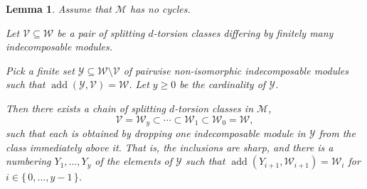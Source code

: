 \documentclass[12pt,reqno]{amsart}
\def\cM{\mathscr{M}}
\def\cV{\mathscr{V}}
\def\cW{\mathscr{W}}
\def\cY{\mathscr{Y}}
\def\add{\operatorname{add}}
\numberwithin{equation}{section}
\newtheorem{Lemma}{Lemma}[section]
\theoremstyle{definition}
\theoremstyle{theorem}
\theoremstyle{definition}
\begin{document}
\begin{Lemma}
\label{lem:deleting_an_indecomposable_from_a_d-torsion_class}
Assume that $\cM$ has no cycles.  

Let $\cV \subseteq \cW$ be a pair of splitting $d$-torsion classes differing by finitely many indecomposable modules.  

Pick a finite set $\cY \subseteq \cW \setminus \cV$ of pairwise non-isomorphic indecomposable modules such that $\add( \cY,\cV ) = \cW$.  Let $y \geqslant 0$ be the cardinality of $\cY\!$.

Then there exists a chain of splitting $d$-torsion classes in $\cM\!$,
\begin{equation}
\label{equ:lem:deleting_an_indecomposable_from_a_d-torsion_class:10}	
  \cV = \cW_y \subset \cdots \subset \cW_1 \subset \cW_0 = \cW\!,
\end{equation}
such that each is obtained by dropping one indecomposable module in $\cY$ from the class immediately above it.  That is, the inclusions are sharp, and there is a numbering $Y_1, \ldots, Y_y$ of the elements of $\cY$ such that $\add( Y_{ i+1 },\cW_{ i+1 } ) = \cW_i$ for $i \in \{\, 0, \ldots, y-1 \,\}$.
\end{Lemma}
\end{document}
